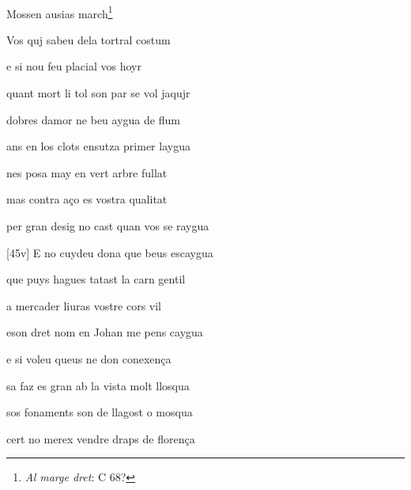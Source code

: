 \documentclass[12pt]{article}
\renewcommand{\espaiAbansEtiquetaPoema}{\vspace{0ex}}
\begin{document}
\begin{estrofa}

\espaiAbansEtiquetaPoema

\\

\begin{rubrica}

Mossen ausias march\footnote{\textit{Al marge dret}: C 68?}

\end{rubrica}

\end{estrofa}


\begin{estrofa}

 Vos quj sabeu dela tortral costum

 e si nou feu placial vos hoyr

 quant mort li tol son par se vol jaqujr

 dobres damor ne beu aygua de flum

 ans en los clots ensutza primer laygua

 nes posa may en vert arbre fullat

 mas contra a\c{c}o es vostra qualitat

 per gran desig no cast quan vos se raygua

\end{estrofa}



\begin{estrofa}

 [45v] E no cuydeu dona que beus escaygua

 que puys hagues tatast la carn gentil

 a mercader liuras vostre cors vil

 eson dret nom en Johan me pens caygua

 e si voleu queus ne don conexen\c{c}a

 sa faz es gran ab la vista molt llosqua

 sos fonaments son de llagost o mosqua

 cert no merex vendre draps de floren\c{c}a

\end{estrofa}
\end{document}
